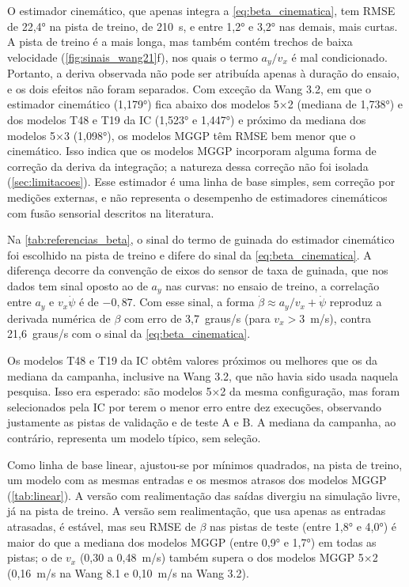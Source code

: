 

O estimador cinemático, que apenas integra a \autoref{eq:beta_cinematica}, tem RMSE de 22,4° na pista de treino, de 210~s, e entre 1,2° e 3,2° nas demais, mais curtas. A pista de treino é a mais longa, mas também contém trechos de baixa velocidade (\autoref{fig:sinais_wang21}f), nos quais o termo $a_y/v_x$ é mal condicionado. Portanto, a deriva observada não pode ser atribuída apenas à duração do ensaio, e os dois efeitos não foram separados. Com exceção da Wang 3.2, em que o estimador cinemático (1,179°) fica abaixo dos modelos 5×2 (mediana de 1,738°) e dos modelos T48 e T19 da IC (1,523° e 1,447°) e próximo da mediana dos modelos 5×3 (1,098°), os modelos MGGP têm RMSE bem menor que o cinemático. Isso indica que os modelos MGGP incorporam alguma forma de correção da deriva da integração; a natureza dessa correção não foi isolada (\autoref{sec:limitacoes}). Esse estimador é uma linha de base simples, sem correção por medições externas, e não representa o desempenho de estimadores cinemáticos com fusão sensorial descritos na literatura.

Na \autoref{tab:referencias_beta}, o sinal do termo de guinada do estimador cinemático foi escolhido na pista de treino e difere do sinal da \autoref{eq:beta_cinematica}. A diferença decorre da convenção de eixos do sensor de taxa de guinada, que nos dados tem sinal oposto ao de $a_y$ nas curvas: no ensaio de treino, a correlação entre $a_y$ e $v_x\dot\psi$ é de $-0{,}87$. Com esse sinal, a forma $\dot\beta \approx a_y/v_x + \dot\psi$ reproduz a derivada numérica de $\beta$ com erro de 3,7~graus/s (para $v_x > 3$~m/s), contra 21,6~graus/s com o sinal da \autoref{eq:beta_cinematica}.

Os modelos T48 e T19 da IC obtêm valores próximos ou melhores que os da mediana da campanha, inclusive na Wang 3.2, que não havia sido usada naquela pesquisa. Isso era esperado: são modelos 5×2 da mesma configuração, mas foram selecionados pela IC por terem o menor erro entre dez execuções, observando justamente as pistas de validação e de teste A e B. A mediana da campanha, ao contrário, representa um modelo típico, sem seleção.

Como linha de base linear, ajustou-se por mínimos quadrados, na pista de treino, um modelo com as mesmas entradas e os mesmos atrasos dos modelos MGGP (\autoref{tab:linear}). A versão com realimentação das saídas divergiu na simulação livre, já na pista de treino. A versão sem realimentação, que usa apenas as entradas atrasadas, é estável, mas seu RMSE de $\beta$ nas pistas de teste (entre 1,8° e 4,0°) é maior do que a mediana dos modelos MGGP (entre 0,9° e 1,7°) em todas as pistas; o de $v_x$ (0,30 a 0,48~m/s) também supera o dos modelos MGGP 5×2 (0,16~m/s na Wang 8.1 e 0,10~m/s na Wang 3.2).

